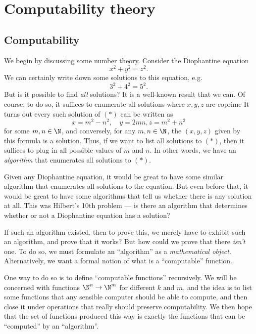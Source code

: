 \documentclass[a4paper]{article}
\begin{document}
\section{Computability theory}
\subsection{Computability}
We begin by discussing some number theory. Consider the Diophantine equation
\[
  x^2 + y^2 = z^2.\tag{$*$}
\]
We can certainly write down some solutions to this equation, e.g.
\[
  3^2 + 4^2 = 5^2.
\]
But is it possible to find \emph{all} solutions? It is a well-known result that we can. Of course, to do so, it suffices to enumerate all solutions where $x, y, z$ are coprime It turns out every such solution of $(*)$ can be written as
\[
  x = m^2 - n^2,\quad y = 2mn, z = m^2 + n^2
\]
for some $m, n \in \N$, and conversely, for any $m, n \in \N$, the $(x, y, z)$ given by this formula is a solution. Thus, if we want to list all solutions to $(*)$, then it suffices to plug in all possible values of $m$ and $n$. In other words, we have an \emph{algorithm} that enumerates all solutions to $(*)$.

Given any Diophantine equation, it would be great to have some similar algorithm that enumerates all solutions to the equation. But even before that, it would be great to have some algorithms that tell us whether there is any solution at all. This was Hilbert's 10th problem --- is there an algorithm that determines whether or not a Diophantine equation has a solution?

If such an algorithm existed, then to prove this, we merely have to exhibit such an algorithm, and prove that it works? But how could we prove that there \emph{isn't} one. To do so, we must formulate an ``algorithm'' as a \emph{mathematical object}. Alternatively, we want a formal notion of what is a ``computable'' function.

One way to do so is to define ``computable functions'' recursively. We will be concerned with functions $\N^n \to \N^m$ for different $k$ and $m$, and the idea is to list some functions that any sensible computer should be able to compute, and then close it under operations that really should preserve computability. We then hope that the set of functions produced this way is exactly the functions that can be ``computed'' by an ``algorithm''.
\end{document}
